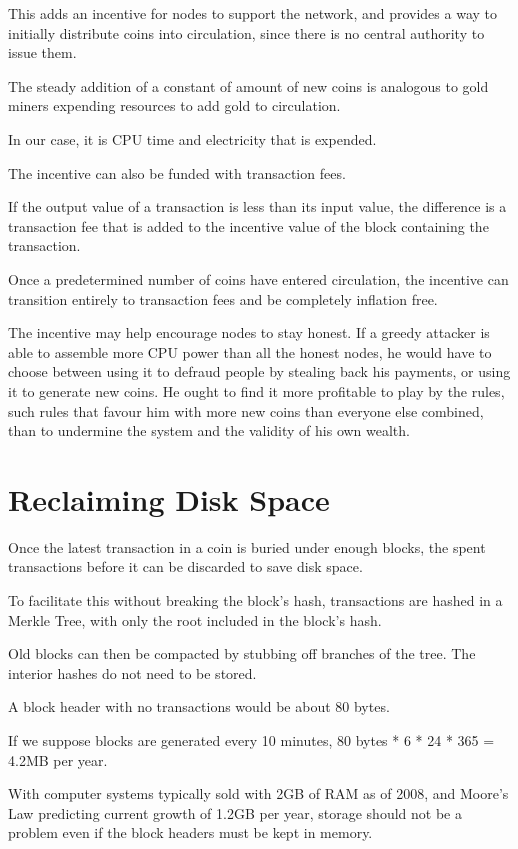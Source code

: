\documentclass{article}
\begin{document}
This adds an incentive for nodes to support the network, and provides a way to initially distribute coins into circulation, since there is no central authority to issue them.

The steady addition of a constant of amount of new coins is analogous to gold miners expending resources to add gold to circulation.

In our case, it is CPU time and electricity that is expended.

The incentive can also be funded with transaction fees.

If the output value of a transaction is less than its input value, the difference is a transaction fee that is added to the incentive value of the block containing the transaction.

Once a predetermined number of coins have entered circulation, the incentive can transition entirely to transaction fees and be completely inflation free.

The incentive may help encourage nodes to stay honest. If a greedy attacker is able to assemble more CPU power than all the honest nodes, he would have to choose between using it to defraud people by stealing back his payments, or using it to generate new coins. He ought to find it more profitable to play by the rules, such rules that favour him with more new coins than everyone else combined, than to undermine the system and the validity of his own wealth.

\section{Reclaiming Disk Space}

Once the latest transaction in a coin is buried under enough blocks, the spent transactions before it can be discarded to save disk space.

To facilitate this without breaking the block's hash, transactions are hashed in a Merkle Tree, with only the root included in the block's hash.

Old blocks can then be compacted by stubbing off branches of the tree. The interior hashes do not need to be stored.

A block header with no transactions would be about 80 bytes.

If we suppose blocks are generated every 10 minutes, 80 bytes * 6 * 24 * 365 = 4.2MB per year.

With computer systems typically sold with 2GB of RAM as of 2008, and Moore's Law predicting current growth of 1.2GB per year, storage should not be a problem even if the block headers must be kept in memory.
\end{document}
